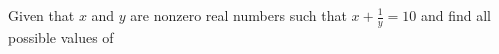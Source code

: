 Given that $x$ and $y$ are nonzero real numbers such that $x+\frac{1}{y}=10$ and  find all possible values of 